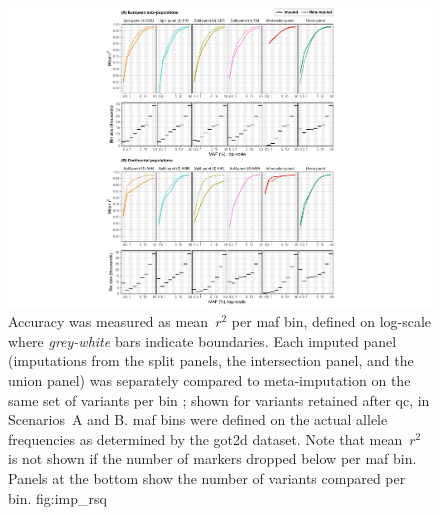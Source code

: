 

\begin{figure}[p]
\includegraphics[width=\textwidth]{./img/ch2/accuracy_imp_maf_rsq}
{Accuracy was measured as mean~$r^2$ per \gls{maf} bin, defined on log-scale where \emph{grey-white} bars indicate boundaries.
Each imputed panel (imputations from the  split panels, the intersection panel, and the union panel) was separately compared to meta-imputation on the same set of variants per bin ; shown for variants retained after \gls{qc}, in Scenarios~A and B.
\Gls{maf} bins were defined on the actual allele frequencies as determined by the \gls{got2d} dataset.
Note that mean~$r^2$ is not shown if the number of markers dropped below  per \gls{maf} bin.
Panels at the bottom show the number of variants compared per bin.}
{fig:imp_rsq}
\end{figure}
